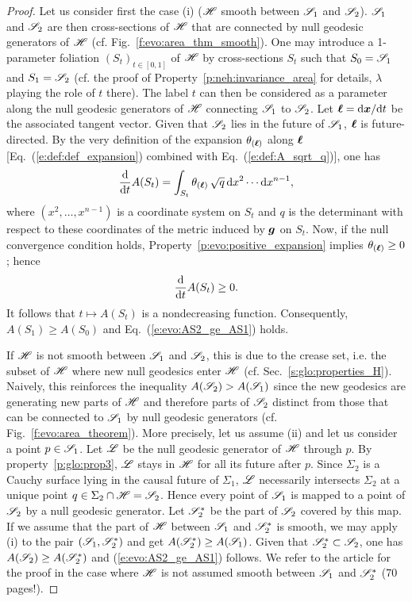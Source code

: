 \begin{proof}
Let us consider first the case (i) ($\mathscr{H}$ smooth between
$\mathscr{S}_1$ and $\mathscr{S}_2$).
$\mathscr{S}_1$ and $\mathscr{S}_2$ are then cross-sections of $\mathscr{H}$
that are connected by null geodesic generators of $\mathscr{H}$
(cf. Fig.~\ref{f:evo:area_thm_smooth}).
One may introduce a 1-parameter foliation $(S_t)_{t\in [0,1]}$ of $\mathscr{H}$ by
cross-sections $S_t$ such that $S_0 = \mathscr{S}_1$ and $S_1 = \mathscr{S}_2$
(cf. the proof of Property~\ref{p:neh:invariance_area} for details, $\lambda$
playing the role of $t$ there). The label $t$
can then be considered as a parameter along the null geodesic generators of $\mathscr{H}$
connecting $\mathscr{S}_1$ to $\mathscr{S}_2$.
Let $\bm{\ell} = \mathrm{d}\bm{x}/\mathrm{d} t$ be the associated tangent vector.
Given that $\mathscr{S}_2$ lies in the future of $\mathscr{S}_1$, $\bm{\ell}$ is future-directed.
By the very definition
of the expansion $\theta_{(\bm{\ell})}$ along $\bm{\ell}$ [Eq.~(\ref{e:def:def_expansion})
combined with Eq.~(\ref{e:def:A_sqrt_q})], one has
\[
    \frac{\mathrm{d} }{\mathrm{d} t} A(S_t) = \int_{S_t} \theta_{(\bm{\ell})} \,  \sqrt{q} \, \mathrm{d} x^2 \cdots \mathrm{d} x^{n-1} ,
\]
where $(x^2, \ldots, x^{n-1})$ is a coordinate system on $S_t$ and $q$ is
the determinant with respect to these coordinates of the metric
induced by $\bm{g}$ on $S_t$.
Now, if the null convergence condition holds, Property~\ref{p:evo:positive_expansion} implies
$\theta_{(\bm{\ell})} \geq 0$; hence
\[
  \frac{\mathrm{d} }{\mathrm{d} t} A(S_t) \geq 0 .
\]
It follows that $t\mapsto A(S_t)$ is a nondecreasing function. Consequently, $A(S_1) \geq A(S_0)$
and Eq.~(\ref{e:evo:AS2_ge_AS1}) holds.

If $\mathscr{H}$ is not smooth between $\mathscr{S}_1$ and $\mathscr{S}_2$, this is due to the crease set,
i.e. the subset of $\mathscr{H}$ where new null geodesics enter $\mathscr{H}$ (cf. Sec.~\ref{s:glo:properties_H}).
Naively, this reinforces the inequality $A(\mathscr{S}_2) > A(\mathscr{S}_1)$ since the new geodesics
are generating new parts of $\mathscr{H}$ and therefore parts of $\mathscr{S}_2$ distinct
from those that can be connected to $\mathscr{S}_1$ by null geodesic generators
(cf. Fig.~\ref{f:evo:area_theorem}). More precisely, let us assume (ii) and
let us consider a point $p\in\mathscr{S}_1$. Let $\mathscr{L}$ be the null geodesic
generator of $\mathscr{H}$ through $p$. By property~\ref{p:glo:prop3}, $\mathscr{L}$ stays in $\mathscr{H}$ for all its future after $p$. Since $\Sigma_2$ is a Cauchy surface lying in the causal future of $\Sigma_1$, $\mathscr{L}$
necessarily intersects $\Sigma_2$ at a unique point $q \in \Sigma_2\cap\mathscr{H} = \mathscr{S}_2$.
Hence every point of $\mathscr{S}_1$ is mapped to a point of $\mathscr{S}_2$ by a null geodesic generator.
Let $\mathscr{S}_2^*$ be the part of $\mathscr{S}_2$ covered by this map.
If we assume that the part of $\mathscr{H}$ between $\mathscr{S}_1$ and $\mathscr{S}_2^*$ is smooth,
we may apply (i) to the pair $(\mathscr{S}_1, \mathscr{S}_2^*)$
and get $A(\mathscr{S}_2^*) \geq A(\mathscr{S}_1)$. Given that $\mathscr{S}_2^* \subset \mathscr{S}_2$, one has
$A(\mathscr{S}_2) \geq A(\mathscr{S}_2^*)$ and (\ref{e:evo:AS2_ge_AS1}) follows.
We refer to the article \cite{ChrusDGH01} for the proof in the case where
$\mathscr{H}$ is not assumed smooth between $\mathscr{S}_1$ and $\mathscr{S}_2^*$ (70 pages!).
\end{proof}

